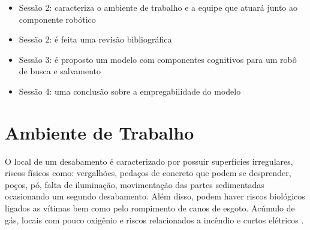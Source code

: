 \documentclass[
	article,			%
	11pt,				%
	oneside,			%
	a4paper,			%
	english,			%
	brazil,				%
	sumario=tradicional	
	]{abntex2}
\begin{document}
\begin{itemize}
\item Sessão 2: caracteriza o ambiente de trabalho e a equipe que atuará junto ao componente robótico
\item Sessão 2: é feita uma revisão bibliográfica
\item Sessão 3: é proposto um modelo com componentes cognitivos para um robô de busca e salvamento
\item Sessão 4: uma conclusão sobre a empregabilidade do modelo
\end{itemize}

\section{Ambiente de Trabalho}
O local de um desabamento é caracterizado por possuir superfícies irregulares, riscos físicos como: vergalhões, pedaços de concreto que podem se desprender, poços, pó, falta de iluminação, movimentação das partes sedimentadas ocasionando um segundo desabamento. Além disso, podem haver riscos biológicos ligados as vítimas bem como pelo rompimento de canos de esgoto. Acúmulo de gás, locais com pouco oxigênio e riscos relacionados a incêndio e curtos elétricos  \cite{Robin2004}.
\end{document}
